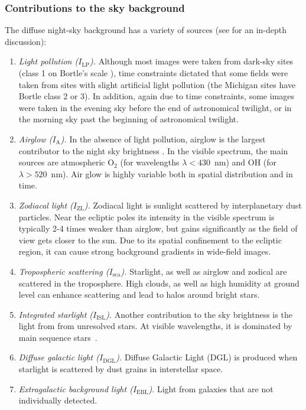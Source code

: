 \documentclass[preprint]{aastex}
\begin{document}
\subsubsection{Contributions to the sky background}
The diffuse night-sky background has a variety of sources (see \citet{Lei1998} for an in-depth discussion):
\begin{enumerate}
 \item \textit{Light pollution ($I_\text{LP}$).} Although most images were taken from dark-sky sites (class 1 on Bortle's scale \citep{Bor2001}), time constraints dictated that some fields were taken from sites with slight artificial light pollution (the Michigan sites have Bortle class 2 or 3). In addition, again due to time constraints, some images were taken in the evening sky before the end of astronomical twilight, or in the morning sky past the beginning of astronomical twilight.

\item \textit{Airglow ($I_\text{A}$).} In the absence of light pollution, airglow is the largest contributor to the night sky brightness \citep{Lei1998}. 
In the visible spectrum, the main sources are atmospheric O$_2$ (for wavelengths $\lambda<430$~nm) and OH (for $\lambda>520$~nm). Air glow is highly variable both in spatial distribution and in time.

\item \textit{Zodiacal light ($I_\text{ZL}$).}  Zodiacal light is sunlight scattered by interplanetary dust particles. Near the ecliptic poles its intensity in the visible spectrum is typically 2-4 times weaker than airglow, but gains significantly as the field of view gets closer to the sun.
Due to its spatial confinement to the ecliptic region, it can cause strong background gradients in wide-field images.

\item \textit{Tropospheric scattering ($I_\text{sca}$).} Starlight, as well as airglow and zodical are scattered in the troposphere. High clouds, as well as high humidity at ground level can enhance scattering and lead to halos around bright stars.

\item \textit{Integrated starlight ($I_\text{ISL}$).} Another contribution to the sky brightness is the light from from unresolved stars. At visible wavelengths, it is dominated by main sequence stars~\citep{Lei1998}.

\item \textit{Diffuse galactic light ($I_\text{DGL}$).} Diffuse Galactic Light (DGL) is produced when starlight is scattered by dust grains in interstellar space.

\item \textit{Extragalactic background light ($I_\text{EBL}$)}. Light from galaxies that are not individually detected.
\end{enumerate}
\end{document}
